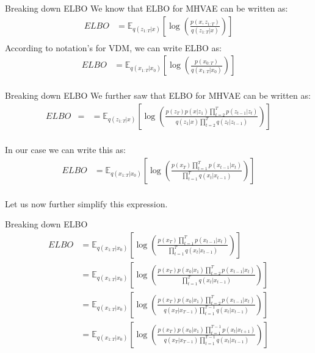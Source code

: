 \begin{frame}{Breaking down ELBO}
    We know that ELBO for MHVAE can be written as:
    \begin{align*}
        ELBO &=  \mathbb{E}_{q(z_{1:T}|x)} \left[ \log \left( \frac{p(x, z_{1:T})}{q(z_{1:T}|x)} \right) \right] \\
    \end{align*}
    According to notation's for VDM, we can write ELBO as:
    \begin{align*}
        ELBO &=  \mathbb{E}_{q(x_{1:T}|x_0)} \left[ \log \left( \frac{p(x_{0:T})}{q(x_{1:T}|x_0)} \right) \right] \\
    \end{align*}
\end{frame}

\begin{frame}{Breaking down ELBO}
    We further saw that ELBO for MHVAE can be written as:
    \begin{align*}
        ELBO &= &= \mathbb{E}_{q(z_{1:T}|x)} \left[ \log \left( \frac{p(z_T)p(x|z_1) \prod_{t=2}^{T} p(z_{t-1}|z_t)}{q(z_1|x) \prod_{t=2}^{T} q(z_t|z_{t-1})} \right) \right] \\
    \end{align*}

    In our case we can write this as:
    \begin{align*}
        ELBO &= \mathbb{E}_{q(x_{1:T}|x_0)} \left[ \log \left( \frac{p(x_T) \prod_{t=1}^{T} p(x_{t-1}|x_t)}{\prod_{t=1}^{T} q(x_t|x_{t-1})} \right) \right] \\
    \end{align*}

    Let us now further simplify this expression.
\end{frame}

\begin{frame}{Breaking down ELBO}
    \begin{align*}
        ELBO &= \mathbb{E}_{q(x_{1:T}|x_0)} \left[ \log \left( \frac{p(x_T) \prod_{t=1}^{T} p(x_{t-1}|x_t)}{\prod_{t=1}^{T} q(x_t|x_{t-1})} \right) \right] \\
        &= \mathbb{E}_{q(x_{1:T}|x_0)} \left[ \log \left( \frac{p(x_T)p(x_0|x_1) \prod_{t=2}^{T} p(x_{t-1}|x_t)}{\prod_{t=1}^{T} q(x_t|x_{t-1})} \right) \right] \\
        &= \mathbb{E}_{q(x_{1:T}|x_0)} \left[ \log \left( \frac{p(x_T)p(x_0|x_1) \prod_{t=2}^{T} p(x_{t-1}|x_t)}{q(x_T|x_{T-1}) \prod_{t=1}^{T-1} q(x_t|x_{t-1})} \right) \right] \\
        &= \mathbb{E}_{q(x_{1:T}|x_0)} \left[ \log \left( \frac{p(x_T)p(x_0|x_1) \prod_{t=1}^{T-1} p(x_{t}|x_{t+1})}{q(x_T|x_{T-1}) \prod_{t=1}^{T-1} q(x_t|x_{t-1})} \right) \right] \\
    \end{align*}
\end{frame}

